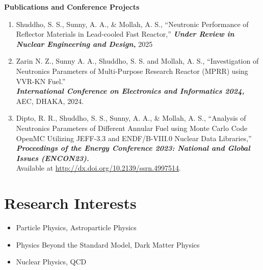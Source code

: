 \documentclass[9pt]{article}
\begin{document}
\textbf{Publications and Conference Projects}\vspace{4pt}
\begin{enumerate}
    \item Shuddho, S. S., Sunny, A. A., \& Mollah, A. S., ``Neutronic Performance of Reflector Materials in Lead-cooled Fast Reactor,'' \textbf{\textit{Under Review in Nuclear Engineering and Design,}} 2025
    \item Zarin N. Z., Sunny A. A., Shuddho, S. S. and Mollah, A. S., ``Investigation of Neutronics Parameters of Multi-Purpose Research Reactor (MPRR) using VVR-KN Fuel.''\\
    \textbf{\textit{International Conference on Electronics and Informatics 2024,}} AEC, DHAKA, 2024.
    \item Dipto, R. R., Shuddho, S. S., Sunny, A. A., \& Mollah, A. S., ``Analysis of Neutronics Parameters of Different Annular Fuel using Monte Carlo Code OpenMC Utilizing JEFF-3.3 and ENDF/B-VIII.0 Nuclear Data Libraries,'' \textbf{\textit{Proceedings of the Energy Conference 2023: National and Global Issues (ENCON23).}}\\
    Available at \textnormal{\url{http://dx.doi.org/10.2139/ssrn.4997514}}.
\end{enumerate}


\section*{Research Interests}\vspace{-2pt}
\begin{itemize}
    \item Particle Physics, Astroparticle Physics
    \item Physics Beyond the Standard Model, Dark Matter Physics
    \item Nuclear Physics, QCD
\end{itemize}

\end{document}
